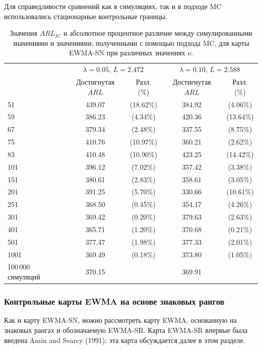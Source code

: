 \begin{table}[!ht]
	\centering
	\caption{Значения \(ARL_{IC}\) и абсолютное процентное различие между симулированными значениями и значениями, полученными с помощью подхода MC, для карты EWMA-SN при различных значениях \(\nu\).}
	\label{tab:4.4}
	\par\smallskip
	\footnotesize Для справедливости сравнений как в симуляциях, так и в подходе MC использовались стационарные контрольные границы.
	\par\smallskip
	\begin{tabular}{@{}lcccc@{}}
		\toprule
		& \multicolumn{2}{c}{\(\lambda = 0.05\), \(L = 2.472\)} & \multicolumn{2}{c}{\(\lambda = 0.10\), \(L = 2.588\)} \\
		& Достигнутая \(ARL\) & Разл. (\%) & Достигнутая \(ARL\) & Разл. (\%) \\
		\midrule
		51   & 439.07 & (18.62\%) & 384.92 & (4.06\%) \\
		59   & 386.23 & (4.34\%)  & 420.36 & (13.64\%) \\
		67   & 379.34 & (2.48\%)  & 337.55 & (8.75\%) \\
		75   & 410.76 & (10.97\%) & 360.21 & (2.62\%) \\
		83   & 410.48 & (10.90\%) & 423.25 & (14.42\%) \\
		101  & 396.12 & (7.02\%)  & 357.42 & (3.38\%) \\
		151  & 380.61 & (2.83\%)  & 358.61 & (3.05\%) \\
		201  & 391.25 & (5.70\%)  & 330.66 & (10.61\%) \\
		251  & 368.50 & (0.45\%)  & 354.17 & (4.26\%) \\
		301  & 369.42 & (0.20\%)  & 379.63 & (2.63\%) \\
		401  & 365.71 & (1.20\%)  & 370.68 & (0.21\%) \\
		501  & 377.47 & (1.98\%)  & 377.33 & (2.01\%) \\
		1001 & 369.49 & (0.18\%)  & 373.80 & (1.05\%) \\
		\midrule
		100\,000 симуляций & 370.15 & & 369.91 & \\
		\bottomrule
	\end{tabular}
\end{table}

\subsubsection{Контрольные карты EWMA на основе знаковых рангов}
Как и карту EWMA-SN, можно рассмотреть карту EWMA, основанную на знаковых рангах и обозначаемую EWMA-SR. Карта EWMA-SR впервые была введена Amin and Searcy (1991); эта карта обсуждается далее в этом разделе.

